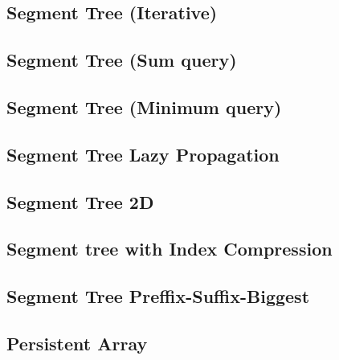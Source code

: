 \documentclass[10pt]{article}
\begin{document}
\begin{multicols*}{2}
\subsection{Segment Tree (Iterative)}


\subsection{Segment Tree (Sum query)}


\subsection{Segment Tree (Minimum query)}


\subsection{Segment Tree Lazy Propagation}


\subsection{Segment Tree 2D}


\subsection{Segment tree with Index Compression}


\subsection{Segment Tree Preffix-Suffix-Biggest}


\subsection{Persistent Array}




\end{multicols*}
\end{document}
